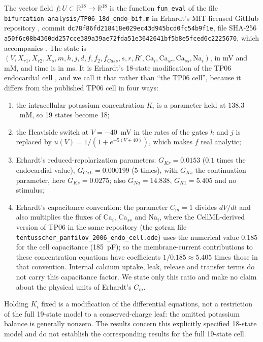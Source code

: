 \documentclass[11pt]{article}
\theoremstyle{definition}
\newcommand{\R}{\mathbb{R}}
\begin{document}
The vector field $f: U \subset \R^{18} \to \R^{18}$ is the function \texttt{fun\_eval} of the file \texttt{bifurcation\ analysis/TP06\_18d\_endo\_bif.m} in Erhardt's MIT-licensed GitHub repository  \cite{erhardtcode}, commit \texttt{dc78f86fd218418e029ec43d945bcd0fc54b9f1e}, file SHA-256 \texttt{a50f6c08b4360dd257cce389a39ae72fda51e3642641bf5b8e5fced6c2225670}, which accompanies \cite{erhardt2025}. The state is $(V, X_{r1}, X_{r2}, X_s, m, h, j, d, f, f_2, f_{Cass}, s, r, R', \mathrm{Ca}_i, \mathrm{Ca}_{sr}, \mathrm{Ca}_{ss}, \mathrm{Na}_i)$, in mV and mM, and time is in ms. It is Erhardt's 18-state modification of the TP06 endocardial cell \cite{tp2006}, and we call it that rather than ``the TP06 cell'', because it differs from the published TP06 cell in four ways:
\begin{enumerate}
\item the intracellular potassium concentration $K_i$ is a parameter held at $138.3$~mM, so 19 states become 18;
\item the Heaviside switch at $V = -40$~mV in the rates of the gates $h$ and $j$ is replaced by $u(V) = 1/(1 + e^{-5(V + 40)})$, which makes $f$ real analytic;
\item Erhardt's reduced-repolarization parameters: $G_{Kr} = 0.0153$ ($0.1$ times the endocardial value), $G_{CaL} = 0.000199$ ($5$ times), with $G_{Ks}$ the continuation parameter, here $G_{Ks} = 0.0275$; also $G_{Na} = 14.838$, $G_{K1} = 5.405$ and no stimulus;
\item Erhardt's capacitance convention: the parameter $C_m = 1$ divides $dV/dt$ and also multiplies the fluxes of $\mathrm{Ca}_i$, $\mathrm{Ca}_{ss}$ and $\mathrm{Na}_i$, where the CellML-derived version of TP06 in the same repository (the gotran file \texttt{tentusscher\_panfilov\_2006\_endo\_cell.ode}) uses the numerical value $0.185$ for the cell capacitance (185~pF); so the membrane-current contributions to these concentration equations have coefficients $1/0.185 \approx 5.405$ times those in that convention. Internal calcium uptake, leak, release and transfer terms do not carry this capacitance factor. We state only this ratio and make no claim about the physical units of Erhardt's $C_m$.
\end{enumerate}
Holding $K_i$ fixed is a modification of the differential equations, not a restriction of the full 19-state model to a conserved-charge leaf: the omitted potassium balance is generally nonzero. The results concern this explicitly specified 18-state model and do not establish the corresponding results for the full 19-state cell.
\end{document}
